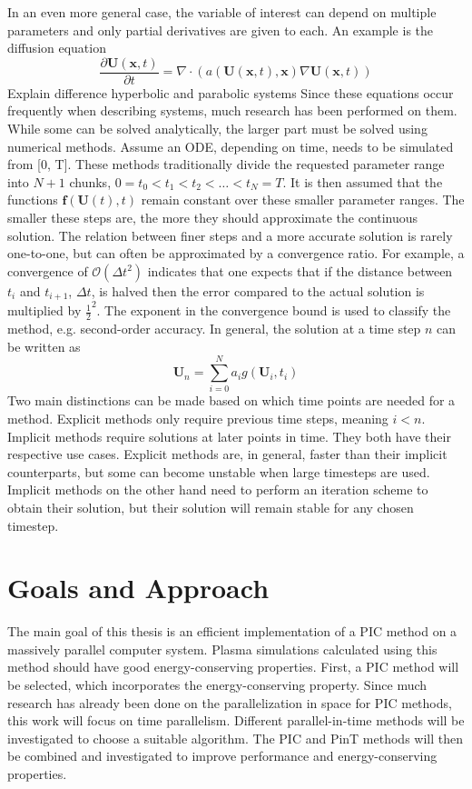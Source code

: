 In an even more general case, the variable of interest can depend on multiple parameters and only partial derivatives are given to each. An example is the diffusion equation
\begin{equation}
\label{eq: general diffusion}
    \frac{\partial \textbf{U}(\textbf{x},t)}{\partial t} = \nabla \cdot (a(\textbf{U}(\textbf{x},t),\textbf{x}) \nabla \textbf{U}(\textbf{x},t))
    \end{equation}
\color{red} Explain difference hyperbolic and parabolic systems \color{black}
Since these equations occur frequently when describing systems, much research has been performed on them. While some can be solved analytically, the larger part must be solved using numerical methods. 
Assume an ODE, depending on time, needs to be simulated from [0, T]. These methods traditionally divide the requested parameter range into $N + 1$ chunks, $0 = t_0 < t_1 < t_2 < \hdots < t_{N} = T$. It is then assumed that the functions $\textbf{f}(\textbf{U}(t),t)$ remain constant over these smaller parameter ranges. The smaller these steps are, the more they should approximate the continuous solution. The relation between finer steps and a more accurate solution is rarely one-to-one, but can often be approximated by a convergence ratio. For example, a convergence of $\mathcal{O}(\Delta t^2)$ indicates that one expects that if the distance between $t_i$ and $t_{i+1}$, $\Delta t$, is halved then the error compared to the actual solution is multiplied by $\frac{1}{2}^2$. The exponent in the convergence bound is used to classify the method, e.g. second-order accuracy. 
In general, the solution at a time step $n$ can be written as
\[
\textbf{U}_n = \sum_{i=0}^N a_i g(\textbf{U}_i,t_i)
\]
Two main distinctions can be made based on which time points are needed for a method. Explicit methods only require previous time steps, meaning $i < n$. Implicit methods require solutions at later points in time. They both have their respective use cases. Explicit methods are, in general, faster than their implicit counterparts, but some can become unstable when large timesteps are used. Implicit methods on the other hand need to perform an iteration scheme to obtain their solution, but their solution will remain stable for any chosen timestep.
 


\section{Goals and Approach}
\label{sec: goals and approach}
The main goal of this thesis is an efficient implementation of a PIC method on a massively parallel computer system. Plasma simulations calculated using this method should have good energy-conserving properties. First, a PIC method will be selected, which incorporates the energy-conserving property. 
Since much research has already been done on the parallelization in space for PIC methods, this work will focus on time parallelism. Different parallel-in-time methods will be investigated to choose a suitable algorithm. The PIC and PinT methods will then be combined and investigated to improve performance and energy-conserving properties.



